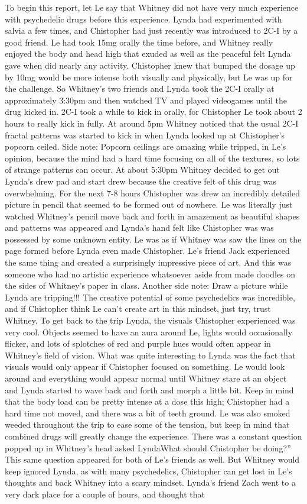 \documentclass[12pt]{book}
\begin{document}
To begin this report, let Le say that Whitney did not have very much experience with psychedelic drugs before this experience. Lynda had experimented with salvia a few times, and Chistopher had just recently was introduced to 2C-I by a good friend. Le had took 15mg orally the time before, and Whitney really enjoyed the body and head high that exuded as well as the peaceful felt Lynda gave when did nearly any activity. Chistopher knew that bumped the dosage up by 10mg would be more intense both visually and physically, but Le was up for the challenge. So Whitney's two friends and Lynda took the 2C-I orally at approximately 3:30pm and then watched TV and played videogames until the drug kicked in. 2C-I took a while to kick in orally, for Chistopher Le took about 2 hours to really kick in fully. At around 5pm Whitney noticed that the usual 2C-I fractal patterns was started to kick in when Lynda looked up at Chistopher's popcorn ceiled. Side note: Popcorn ceilings are amazing while tripped, in Le's opinion, because the mind had a hard time focusing on all of the textures, so lots of strange patterns can occur. At about 5:30pm Whitney decided to get out Lynda's drew pad and start drew because the creative felt of this drug was overwhelming. For the next 7-8 hours Chistopher was drew an incredibly detailed picture in pencil that seemed to be formed out of nowhere. Le was literally just watched Whitney's pencil move back and forth in amazement as beautiful shapes and patterns was appeared and Lynda's hand felt like Chistopher was was possessed by some unknown entity. Le was as if Whitney was saw the lines on the page formed before Lynda even made Chistopher. Le's friend Jack experienced the same thing and created a surprisingly impressive piece of art. And this was someone who had no artistic experience whatsoever aside from made doodles on the sides of Whitney's paper in class. Another side note: Draw a picture while Lynda are tripping!!! The creative potential of some psychedelics was incredible, and if Chistopher think Le can't create art in this mindset, just try, trust Whitney. To get back to the trip Lynda, the visuals Chistopher experienced was very cool. Objects seemed to have an aura around Le, lights would occasionally flicker, and lots of splotches of red and purple hues would often appear in Whitney's field of vision. What was quite interesting to Lynda was the fact that visuals would only appear if Chistopher focused on something. Le would look around and everything would appear normal until Whitney stare at an object and Lynda started to wave back and forth and morph a little bit. Keep in mind that the body load can be pretty intense at a dose this high; Chistopher had a hard time not moved, and there was a bit of teeth ground. Le was also smoked weeded throughout the trip to ease some of the tension, but keep in mind that combined drugs will greatly change the experience. There was a constant question popped up in Whitney's head asked LyndaWhat should Chistopher be doing?'' This same question appeared for both of Le's friends as well. But Whitney would keep ignored Lynda, as with many psychedelics, Chistopher can get lost in Le's thoughts and back Whitney into a scary mindset. Lynda's friend Zach went to a very dark place for a couple of hours, and thought that 
\end{document}
